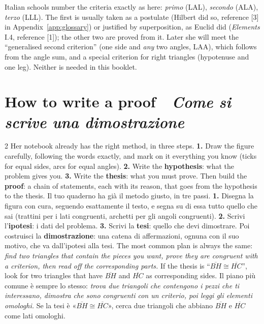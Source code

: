 \documentclass[10pt,a4paper,oneside]{book}
\newif\ifIT
\newenvironment{bi}%
  {\begin{paracol}{2}\global\ITfalse\selectlanguage{english}}%
  {\end{paracol}}
\newcommand{\IT}{\switchcolumn\global\ITtrue\selectlanguage{italian}}
\newcommand{\EN}{\switchcolumn*\global\ITfalse\selectlanguage{english}}
\newcommand{\bisection}[2]{%
  \Needspace{7\baselineskip}%
  \section[#1 \textperiodcentered\ #2]{#1 {\color{itgreen}\itshape\,\textperiodcentered\ #2}}}
\newcommand{\seg}[1]{\overline{#1}}         %
\begin{document}
\begin{tutor}
Italian schools number the criteria exactly as here: \emph{primo} (LAL), \emph{secondo} (ALA), \emph{terzo} (LLL). The first is usually taken as a postulate (Hilbert did so, reference [3] in Appendix~\ref{app:glossary}) or justified by superposition, as Euclid did (\emph{Elements} I.4, reference [1]); the other two are proved from it. Later she will meet the ``generalised second criterion'' (one side and \emph{any} two angles, LAA), which follows from the angle sum, and a special criterion for right triangles (hypotenuse and one leg). Neither is needed in this booklet.
\end{tutor}

\bisection{How to write a proof}{Come si scrive una dimostrazione}\label{sec:howto}
\begin{bi}
Her notebook already has the right method, in three steps. \textbf{1.} Draw the figure carefully, following the words exactly, and mark on it everything you know (ticks for equal sides, arcs for equal angles). \textbf{2.} Write the \textbf{hypothesis}: what the problem gives you. \textbf{3.} Write the \textbf{thesis}: what you must prove. Then build the \textbf{proof}: a chain of statements, each with its reason, that goes from the hypothesis to the thesis.
\IT
Il tuo quaderno ha già il metodo giusto, in tre passi. \textbf{1.} Disegna la figura con cura, seguendo esattamente il testo, e segna su di essa tutto quello che sai (trattini per i lati congruenti, archetti per gli angoli congruenti). \textbf{2.} Scrivi l'\textbf{ipotesi}: i dati del problema. \textbf{3.} Scrivi la \textbf{tesi}: quello che devi dimostrare. Poi costruisci la \textbf{dimostrazione}: una catena di affermazioni, ognuna con il suo motivo, che va dall'ipotesi alla tesi.
\EN
The most common plan is always the same: \emph{find two triangles that contain the pieces you want, prove they are congruent with a criterion, then read off the corresponding parts.} If the thesis is ``$\seg{BH} \cong \seg{HC}$'', look for two triangles that have $\seg{BH}$ and $\seg{HC}$ as corresponding sides.
\IT
Il piano più comune è sempre lo stesso: \emph{trova due triangoli che contengono i pezzi che ti interessano, dimostra che sono congruenti con un criterio, poi leggi gli elementi omologhi.} Se la tesi è «$\seg{BH} \cong \seg{HC}$», cerca due triangoli che abbiano $\seg{BH}$ e $\seg{HC}$ come lati omologhi.
\end{bi}
\end{document}
